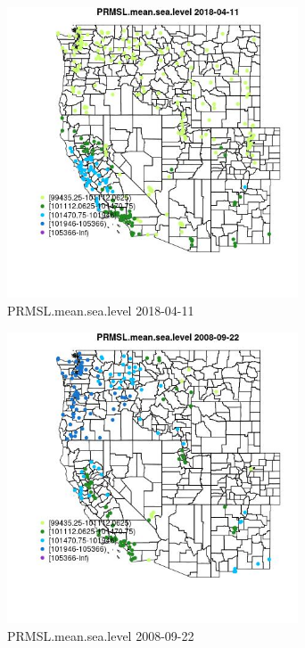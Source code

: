 \begin{figure} 
\centering  
\includegraphics[width=0.77\textwidth]{Code_Outputs/Report_ML_input_PM25_Step4_part_e_de_duplicated_aves_compiled_2019-05-18wNAs_MapObsPRMSLmeansealevel2018-04-11.jpg} 
\caption{\label{fig:Report_ML_input_PM25_Step4_part_e_de_duplicated_aves_compiled_2019-05-18wNAsMapObsPRMSLmeansealevel2018-04-11}PRMSL.mean.sea.level 2018-04-11} 
\end{figure} 
 

\begin{figure} 
\centering  
\includegraphics[width=0.77\textwidth]{Code_Outputs/Report_ML_input_PM25_Step4_part_e_de_duplicated_aves_compiled_2019-05-18wNAs_MapObsPRMSLmeansealevel2008-09-22.jpg} 
\caption{\label{fig:Report_ML_input_PM25_Step4_part_e_de_duplicated_aves_compiled_2019-05-18wNAsMapObsPRMSLmeansealevel2008-09-22}PRMSL.mean.sea.level 2008-09-22} 
\end{figure} 
 

